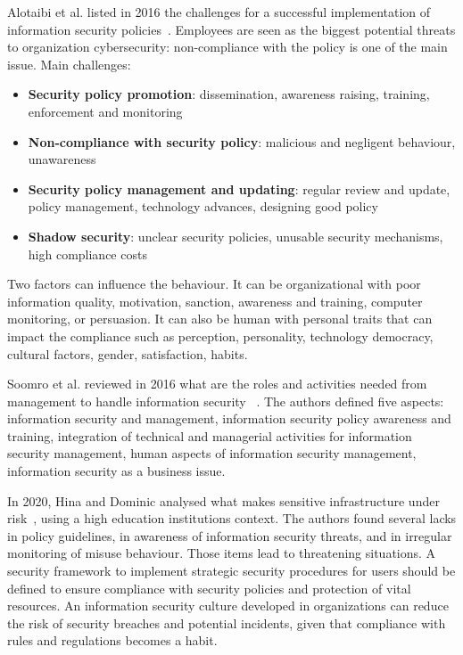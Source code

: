 Alotaibi et al. listed in 2016 the challenges for a successful implementation of information security policies~\cite{alotaibi_information_2016}. Employees are seen as the biggest potential threats to organization cybersecurity: non-compliance with the policy is one of the main issue. Main challenges: 
\begin{itemize}
	\item \textbf{Security policy promotion}: dissemination, awareness raising, training, enforcement and monitoring
	\item \textbf{Non-compliance with security policy}: malicious and negligent behaviour, unawareness
	\item \textbf{Security policy management and updating}: regular review and update, policy management, technology advances, designing good policy
	\item \textbf{Shadow security}: unclear security policies, unusable security mechanisms, high compliance costs
\end{itemize} %
Two factors can influence the behaviour. It can be organizational with poor information quality, motivation, sanction, awareness and training, computer monitoring, or persuasion. It can also be human with personal traits that can impact the compliance such as perception, personality, technology democracy, cultural factors, gender, satisfaction, habits. %

Soomro et al. reviewed in 2016 what are the roles and activities needed from management to handle information security ~\cite{soomro_information_2016}. The authors defined five aspects: information security and management, information security policy awareness and training, integration of technical and managerial activities for information security management, human aspects of information security management, information security as a business issue. %

In 2020, Hina and Dominic analysed what makes sensitive infrastructure under risk~\cite{hina_information_2020}, using a high education institutions context. The authors found several lacks in policy guidelines, in awareness of information security threats, and in irregular monitoring of misuse behaviour. Those items lead to threatening situations. A security framework to implement strategic security procedures for users should be defined to ensure compliance with security policies and protection of vital resources. An information security culture developed in organizations can reduce the risk of security breaches and potential incidents, given that compliance with rules and regulations becomes a habit. %

